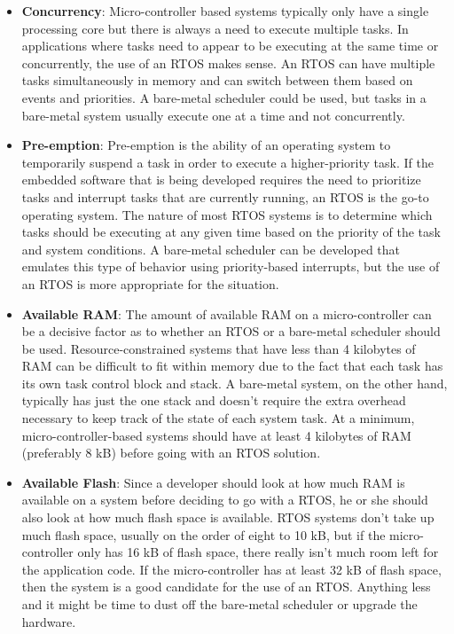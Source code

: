 \documentclass[12pt]{report}
\begin{document}
\begin{itemize}
    \item \textbf{Concurrency}: Micro-controller based systems typically only have a single processing core but there is always a need to execute multiple tasks. In applications where tasks need to appear to be executing at the same time or concurrently, the use of an RTOS makes sense. An RTOS can have multiple tasks simultaneously in memory and can switch between them based on events and priorities. A bare-metal scheduler could be used, but tasks in a bare-metal system usually execute one at a time and not concurrently.
    \item \textbf{Pre-emption}: Pre-emption is the ability of an operating system to temporarily suspend a task in order to execute a higher-priority task. If the embedded software that is being developed requires the need to prioritize tasks and interrupt tasks that are currently running, an RTOS is the go-to operating system. The nature of most RTOS systems is to determine which tasks should be executing at any given time based on the priority of the task and system conditions. A bare-metal scheduler can be developed that emulates this type of behavior using priority-based interrupts, but the use of an RTOS is more appropriate for the situation.
    \item \textbf{Available RAM}: The amount of available RAM on a micro-controller can be a decisive factor as to whether an RTOS or a bare-metal scheduler should be used. Resource-constrained systems that have less than 4 kilobytes of RAM can be difficult to fit within memory due to the fact that each task has its own task control block and stack. A bare-metal system, on the other hand, typically has just the one stack and doesn't require the extra overhead necessary to keep track of the state of each system task. At a minimum, micro-controller-based systems should have at least 4 kilobytes of RAM (preferably 8 kB) before going with an RTOS solution.
    \item \textbf{Available Flash}: Since a developer should look at how much RAM is available on a system before deciding to go with a RTOS, he or she should also look at how much flash space is available. RTOS systems don't take up much flash space, usually on the order of eight to 10 kB, but if the micro-controller only has 16 kB of flash space, there really isn't much room left for the application code. If the micro-controller has at least 32 kB of flash space, then the system is a good candidate for the use of an RTOS. Anything less and it might be time to dust off the bare-metal scheduler or upgrade the hardware.

\end{itemize}
\end{document}
